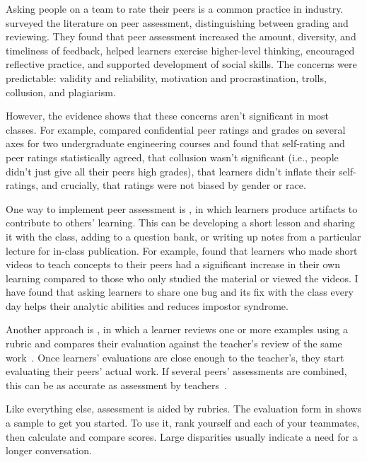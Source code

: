 
Asking people on a team to rate their peers is a common practice in industry.
\cite{Sond2012} surveyed the literature on peer assessment,
distinguishing between grading and reviewing.
They found that peer assessment increased the amount, diversity, and timeliness of feedback,
helped learners exercise higher-level thinking,
encouraged reflective practice,
and supported development of social skills.
The concerns were predictable:
validity and reliability,
motivation and procrastination,
trolls, collusion, and plagiarism.

However,
the evidence shows that these concerns aren't significant in most classes.
For example,
\cite{Kauf2000} compared confidential peer ratings and grades on several axes
for two undergraduate engineering courses
and found that self-rating and peer ratings statistically agreed,
that collusion wasn't significant (i.e., people didn't just give all their peers high grades),
that learners didn't inflate their self-ratings,
and crucially,
that ratings were not biased by gender or race.

One way to implement peer assessment is ,
in which learners produce artifacts to contribute to others' learning.
This can be developing a short lesson and sharing it with the class,
adding to a question bank,
or writing up notes from a particular lecture for in-class publication.
For example,
\cite{Fran2018} found that learners who made short videos to teach concepts to their peers
had a significant increase in their own learning
compared to those who only studied the material or viewed the videos.
I have found that asking learners to share one bug and its fix with the class every day
helps their analytic abilities and reduces impostor syndrome.

Another approach is ,
in which a learner reviews one or more examples using a rubric
and compares their evaluation against the teacher's review of the same work~\cite{Kulk2013}.
Once learners' evaluations are close enough to the teacher's,
they start evaluating their peers' actual work.
If several peers' assessments are combined,
this can be as accurate as assessment by teachers~\cite{Pare2008}.

Like everything else,
assessment is aided by rubrics.
The evaluation form in  shows a sample to get you started.
To use it,
rank yourself and each of your teammates,
then calculate and compare scores.
Large disparities usually indicate a need for a longer conversation.

